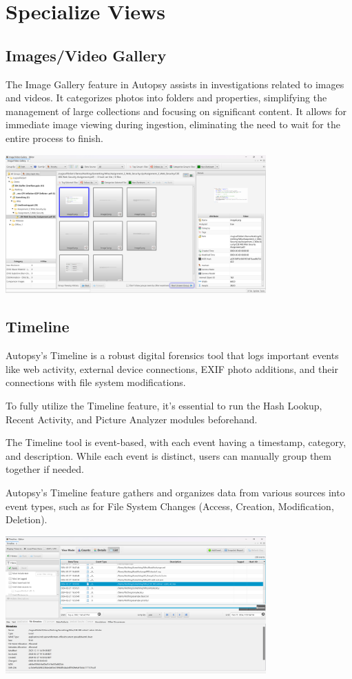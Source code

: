 \documentclass{extarticle}
\begin{document}
\section{Specialize Views}
\subsection{Images/Video Gallery}
The Image Gallery feature in Autopsy assists in investigations related to images and videos. It categorizes photos into folders and properties, simplifying the management of large collections and focusing on significant content. It allows for immediate image viewing during ingestion, eliminating the need to wait for the entire process to finish.

\begin{center}
    \includegraphics[width=0.75\textwidth]{4/4.1/Image Gallery.png}
\end{center}

\subsection{Timeline}

Autopsy's Timeline is a robust digital forensics tool that logs important events like web activity, external device connections, EXIF photo additions, and their connections with file system modifications.

To fully utilize the Timeline feature, it's essential to run the Hash Lookup, Recent Activity, and Picture Analyzer modules beforehand.

The Timeline tool is event-based, with each event having a timestamp, category, and description. While each event is distinct, users can manually group them together if needed.

Autopsy's Timeline feature gathers and organizes data from various sources into event types, such as for File System Changes (Access, Creation, Modification, Deletion).

\begin{center}
    \includegraphics[width=0.75\textwidth]{4/4.2/Timeline View-1.png}
\end{center}
\end{document}
